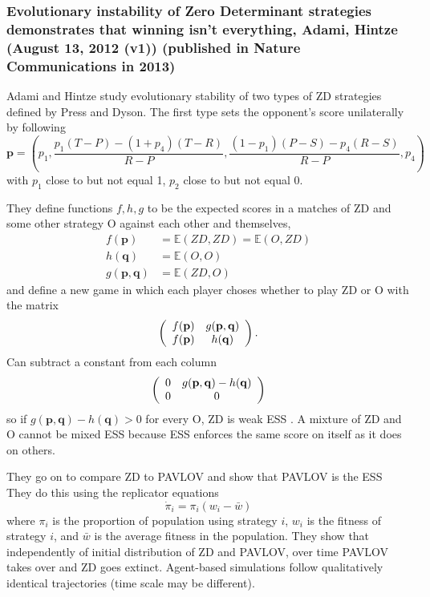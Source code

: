 \subsubsection{Evolutionary instability of Zero Determinant strategies demonstrates that winning isn't everything, Adami, Hintze \cite{Adami_Hintze_2014}
\\(August 13, 2012 (v1)) (published in Nature Communications in 2013)}

Adami and Hintze study evolutionary stability of two types of ZD strategies defined by Press and Dyson. The first type sets the opponent's score unilaterally by following 
\[
\mathbf{p} = \left(p_1, \frac{p_1(T-P) - (1+p_4)(T-R)}{R-P}, \frac{(1-p_1)(P-S) - p_4(R-S)}{R-P}, p_4\right)
\]
with $p_1$ close to but not equal 1, $p_2$ close to but not equal 0.

They define functions $f, h, g$ to be the expected scores in a matches of ZD and some other strategy O against each other and themselves,
\begin{align*}
f(\mathbf{p})&=\mathbb{E}(ZD, ZD) = \mathbb{E}(O, ZD)\\
h(\mathbf{q}) &= \mathbb{E}(O, O)\\
g(\mathbf{p}, \mathbf{q}) &= \mathbb{E}(ZD, O)
\end{align*}
and define a new game in which each player choses whether to play ZD or O with the matrix
\[
\left(
\begin{array}{c c}
f(\mathbf{p}) & g(\mathbf{p}, \mathbf{q}) \\
f(\mathbf{p}) & h(\mathbf{q})
\end{array}
\right)
.\]
Can subtract a constant from each column 
\[
\left(
\begin{array}{c c}
0 & g(\mathbf{p}, \mathbf{q}) - h(\mathbf{q}) \\
0 & 0
\end{array}
\right)
\]
so if $g(\mathbf{p}, \mathbf{q}) - h(\mathbf{q}) > 0$ for every O, ZD is weak ESS . A mixture of ZD and O cannot be mixed ESS because ESS enforces the same score on itself as it does on others.

They go on to compare ZD to PAVLOV and show that PAVLOV is the ESS  They do this using the replicator equations
\[
\dot{\pi}_i = \pi_i(w_i - \bar{w})
\]
where $\pi_i$ is the proportion of population using strategy $i$, $w_i$ is the fitness of strategy $i$, and $\bar{w}$ is the average fitness in the population. They show that independently of initial distribution of ZD and PAVLOV, over time PAVLOV takes over and ZD goes extinct. Agent-based simulations follow qualitatively identical trajectories (time scale may be different).

